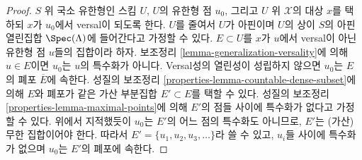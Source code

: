 \begin{proof}
$S$ 위 국소 유한형인 스킴 $U$, $U$의 유한형 점 $u_0$,
그리고 $U$ 위 $\mathcal{X}$의 대상 $x$를 택하되 $x$가 $u_0$에서
versal이 되도록 한다. $U$를 줄여서 $U$가 아핀이며 $U$의 상이
$S$의 아핀 열린집합 $\Spec(\Lambda)$에 들어간다고 가정할 수 있다.
$E \subset U$를 $x$가 $u$에서 versal이 아닌 유한형 점 $u$들의
집합이라 하자. 보조정리 \ref{lemma-generalization-versality}에 의해
$u \in E$이면 $u_0$는 $u$의 특수화가 아니다.
Versal성의 열린성이 성립하지 않으면 $u_0$는 $E$의 폐포 $\overline{E}$에
속한다. 성질의 보조정리 \ref{properties-lemma-countable-dense-subset}에
의해 $E$와 폐포가 같은 가산 부분집합 $E' \subset E$를 택할 수 있다.
성질의 보조정리 \ref{properties-lemma-maximal-points}에 의해 $E'$의
점들 사이에 특수화가 없다고 가정할 수 있다. 위에서 지적했듯이
$u_0$는 $E'$의 어느 점의 특수화도 아니므로, $E'$는 (가산) 무한
집합이어야 한다. 따라서 $E' = \{u_1, u_2, u_3, \ldots\}$라 쓸 수 있고,
$u_i$들 사이에 특수화가 없으며 $u_0$는 $E'$의 폐포에 속한다.


\end{proof}

